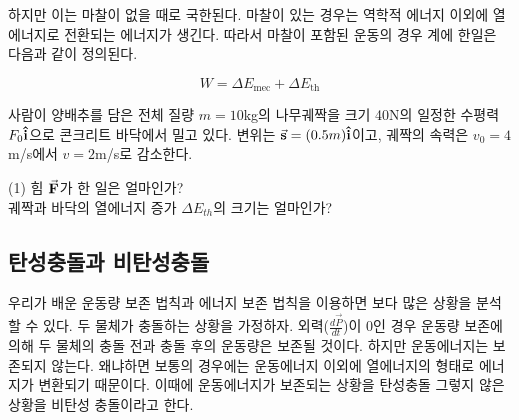 \begin{flushleft}




하지만 이는 마찰이 없을 때로 국한된다. 마찰이 있는 경우는 역학적 에너지 이외에 열에너지로 전환되는 에너지가 생긴다. 따라서 
마찰이 포함된 운동의 경우 계에 한일은 다음과 같이 정의된다. 

\begin{equation}
  W=\Delta E_{\textrm{mec}}+\Delta E_{\textrm{th}}
\end{equation}

\begin{task}[일, 마찰력]
  \begin{flushleft}
사람이 양배추를 담은 전체 질량 $m=10$kg의 나무궤짝을 크기 40N의 일정한 수평력 $F_0\vu{i}$으로 콘크리트 바닥에서 밀고 있다. 
변위는 $\va{s}=(0.5m) \vu{i}$이고, 궤짝의 속력은 $v_0=4$m/s에서 $v=2$m/s로 감소한다. 
    \begin{tasks}[label=(\arabic*)](1)
      \task 힘 $\va{F}$가 한 일은 얼마인가? \\
      \task 궤짝과 바닥의 열에너지 증가 $\Delta E_{th}$의 크기는 얼마인가?\\
   \end{tasks}
\end{flushleft}
\end{task}


\subsection{탄성충돌과 비탄성충돌}
우리가 배운 운동량 보존 법칙과 에너지 보존 법칙을 이용하면 보다 많은 상황을 분석할 수 있다. 
두 물체가 충돌하는 상황을 가정하자. 외력($\frac{d\vec P}{dt}$)이 0인 경우 운동량 보존에 의해 두 물체의 충돌 전과 충돌 후의 운동량은 보존될 것이다. 
하지만 운동에너지는 보존되지 않는다. 왜냐하면 보통의 경우에는 운동에너지 이외에 열에너지의 형태로 에너지가 변환되기 때문이다.
이때에 운동에너지가 보존되는 상황을 탄성충돌 그렇지 않은 상황을 비탄성 충돌이라고 한다. 



\marginpar{
  
}
\end{flushleft}
